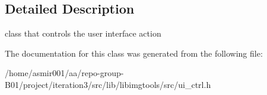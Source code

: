 \subsection{Detailed Description}
class that controls the user interface action 

The documentation for this class was generated from the following file\+:\begin{DoxyCompactItemize}
\item 
/home/asmir001/aa/repo-\/group-\/\+B01/project/iteration3/src/lib/libimgtools/src/ui\+\_\+ctrl.\+h\end{DoxyCompactItemize}
